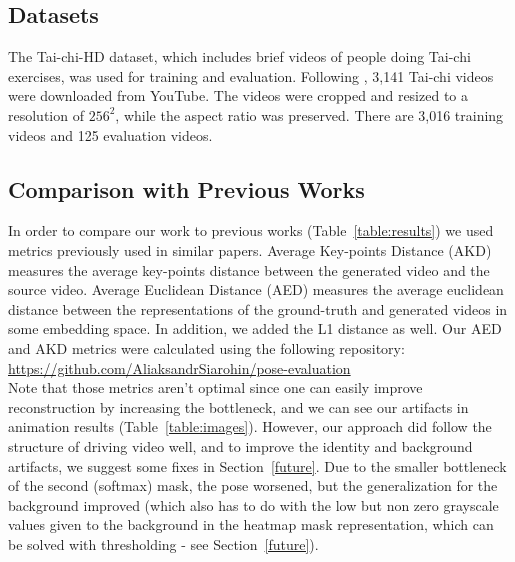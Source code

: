 \documentclass{article}
\begin{document}
\subsection{Datasets}
The Tai-chi-HD dataset, which includes brief videos of people doing Tai-chi
exercises, was used for training and evaluation. Following
\cite{siarohin2020order}, 3,141 Tai-chi videos were downloaded from YouTube.
The videos were cropped and resized to a resolution of $256^2$, while the
aspect ratio was preserved. There are 3,016 training videos and 125
evaluation videos.

\subsection{Comparison with Previous Works}
In order to compare our work to previous works (Table~\ref{table:results})
we used metrics previously used in similar papers.
Average Key-points Distance \cite{cao2017realtime} (AKD)
measures the average key-points distance between the generated video and
the source video. Average Euclidean Distance \cite{zheng2019joint} (AED)
measures the average euclidean distance
between the representations of the ground-truth and generated videos in
some embedding space. In addition, we added the L1 distance as well.
Our AED and AKD metrics were calculated using the following repository:
\url{https://github.com/AliaksandrSiarohin/pose-evaluation}
\\
Note that those metrics aren't optimal since one can easily improve
reconstruction by increasing the bottleneck, and we can see our
artifacts in animation results (Table~\ref{table:images}).
However, our approach did follow the structure of driving video well,
and to improve the identity and background artifacts,
we suggest some fixes in Section~\ref{future}.
Due to the smaller bottleneck of the second (softmax) mask, the pose
worsened, but the generalization for the background improved (which also
has to do with the low but non zero grayscale values given to the
background in the heatmap mask representation, which can be solved with
thresholding - see Section~\ref{future}).


\end{document}
